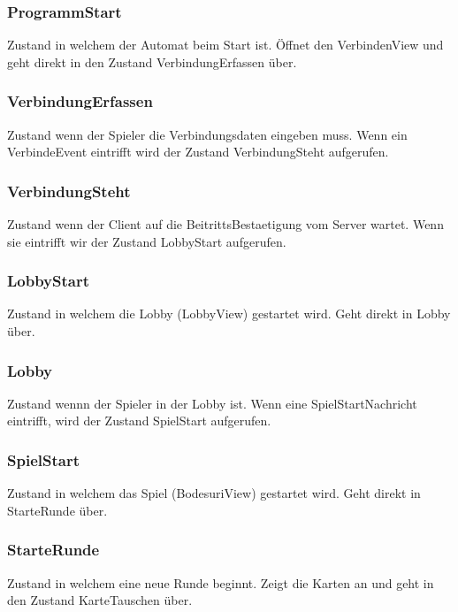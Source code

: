 \documentclass[12pt,halfparskip]{scrartcl}
\begin{document}
\subsubsection{ProgrammStart} %
\label{ssub:programmstart}
Zustand in welchem der Automat beim Start ist. Öffnet den VerbindenView und geht direkt in den Zustand VerbindungErfassen über.

\subsubsection{VerbindungErfassen} %
\label{ssub:verbinungerfassen}
Zustand wenn der Spieler die Verbindungsdaten eingeben muss. Wenn ein VerbindeEvent eintrifft wird der Zustand VerbindungSteht aufgerufen.

\subsubsection{VerbindungSteht} %
\label{ssub:verbindungsteht}
Zustand wenn der Client auf die BeitrittsBestaetigung vom Server wartet. Wenn sie eintrifft wir der Zustand LobbyStart aufgerufen.

\subsubsection{LobbyStart} %
\label{ssub:lobbystart}
Zustand in welchem die Lobby (LobbyView) gestartet wird. Geht direkt in Lobby über.

\subsubsection{Lobby} %
\label{ssub:lobby}
Zustand wennn der Spieler in der Lobby ist. Wenn eine SpielStartNachricht eintrifft, wird der Zustand SpielStart aufgerufen.

\subsubsection{SpielStart} %
\label{ssub:spielstart}
Zustand in welchem das Spiel (BodesuriView) gestartet wird. Geht direkt in StarteRunde über.

\subsubsection{StarteRunde} %
\label{ssub:starterunde}
Zustand in welchem eine neue Runde beginnt. Zeigt die Karten an und geht in den Zustand KarteTauschen über.
\end{document}
